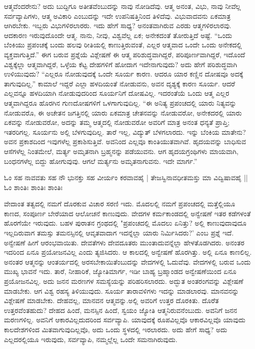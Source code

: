 ಆತ್ಮವೆಂದರೇನು? ಅದು ಬುದ್ದಿಗೂ ಅತೀತವೆಂಬುದನ್ನು ನಾವು ನೋಡಿದೆವು. ಆತ್ಮ ಅನಂತ, ವಿಭು, ನಾವು ನೀವೆಲ್ಲ ಸರ್ವವ್ಯಾಪಿಗಳು, ಆತ್ಮ ಅವಿಕಾರಿ ಎಂಬುದನ್ನು ಇದೇ ಉಪನಿಷತ್ತಿನಿಂದ ತಿಳಿದೆವು. ವಿಭುವಾದವನು ಏಕಮಾತ್ರ ಆಗಿರಬೇಕು. ಇಬ್ಬರು ವಿಭುಗಳಿರಲಾರರು. ಇದು ಹೇಗೆ ಸಾಧ್ಯ? ಅನಂತವಾಗಿರುವ ಎರಡು ಆತ್ಮಗಳಿರಲಾರವು. ಆದಕಾರಣ ಇರುವುದೊಂದೇ ಆತ್ಮ. ನಾನು, ನೀವು, ವಿಶ್ವವೆಲ್ಲ ಏಕ; ಅನೇಕದಂತೆ ತೋರುತ್ತಿದೆ ಅಷ್ಟೆ. “ಒಂದು ಬೆಂಕಿಯು ಪ್ರಪಂಚಕ್ಕೆ ಬಂದು ಹಲವು ರೀತಿಯಲ್ಲಿ ಕಾಣುತ್ತಿರುವಂತೆ, ಎಲ್ಲರ ಆತ್ಮವಾದ ಒಂದೇ ಒಂದು ಅನೇಕದಲ್ಲಿ ವ್ಯಕ್ತವಾಗುತ್ತಿದೆ.” ಈಗ ಬರುವ ಪ್ರಶ್ನೆಯೆ ವಿಶ್ಲೇಷಣೆ ಈ ಆತ್ಮ ಪರಿಶುದ್ಧವಾಗಿದ್ದರೆ, ಪರಿಪೂರ್ಣವಾಗಿದ್ದರೆ, ಇದೊಂದೆ ವಿಶ್ವಕ್ಕೆಲ್ಲಾ ಆತ್ಮವಾಗಿದ್ದರೆ, ಒಳ್ಳೆಯ ಕೆಟ್ಟ ದೇಹಗಳಿಗೆ ಹೋದಾಗ ಇದೇನಾಗುವುದು? ಅದು ಹೇಗೆ ಪರಿಶುದ್ಧವಾಗಿ ಉಳಿಯುವುದು? “ಎಲ್ಲರೂ ನೋಡುವುದಕ್ಕೆ ಒಂದೇ ಸೂರ್ಯ ಕಾರಣ. ಆದರೂ ಯಾರ ಕಣ್ಣಿನ ದೋಷವೂ ಅದಕ್ಕೆ ತಾಗುವುದಿಲ್ಲ.” ಕಾಮಾಲೆ ಇದ್ದರೆ ಎಲ್ಲಾ ಹಳದಿಯಂತೆ ನೋಡುವನು, ಅವನ ದೃಶ್ಯಕ್ಕೆ ಕಾರಣ ಸೂರ್ಯ. ಆದರೆ ಎಲ್ಲವನ್ನೂ ಹಳದಿಯಾಗಿ ನೋಡುವುದರಿಂದ ಸೂರ್ಯನಿಗೆ ದೋಷವಿಲ್ಲ. ಇದರಂತೆಯೆ ಒಂದು ಆತ್ಮ ಎಲ್ಲರ ಆತ್ಮವಾಗಿದ್ದರೂ ಹೊರಗಿನ ಗುಣದೋಷಗಳಿಗೆ ಒಳಗಾಗುವುದಿಲ್ಲ. “ಈ ಅನಿತ್ಯ ಪ್ರಪಂಚದಲ್ಲಿ ಯಾರು ನಿತ್ಯವನ್ನು ನೋಡುವರೊ, ಈ ಅಚೇತನ ಜಗತ್ತಿನಲ್ಲಿ ಯಾರು ಏಕಮಾತ್ರ ಚೇತನವನ್ನು ನೋಡುವರೋ, ಅನೇಕದರಲ್ಲಿ ಯಾರು ಏಕವನ್ನು ನೋಡುವರೋ, ಅದನ್ನು ತಮ್ಮ ಆತ್ಮದಲ್ಲಿ ನೋಡುವರೋ ಅವರಿಗೆ ಮಾತ್ರ ಅನಂತ ಧನ್ಯತೆ ಪ್ರಾಪ್ತಿ; ಇತರರಿಗಲ್ಲ. ಸೂರ್ಯನು ಅಲ್ಲಿ ಬೆಳಗುವುದಿಲ್ಲ. ತಾರೆ ಇಲ್ಲ, ವಿದ್ಯುತ್ ಬೆಳಗಲಾರದು. ಇನ್ನು ಬೆಂಕಿಯ ಮಾತೇನು? ಅವನ ಪ್ರಕಾಶದಿಂದ ಇವುಗಳೆಲ್ಲ ಪ್ರಕಾಶಿಸುತ್ತಿವೆ. ಅವನಿಂದ ಎಲ್ಲವೂ ಕಾಂತಿಯುತವಾಗಿವೆ. ಹೃದಯವನ್ನು ಬಾಧಿಸುವ ಆಸೆಗಳೆಲ್ಲ ನಿಂತಮೇಲೆ, ಮರ್ತ್ಯ ಅಮೃತನಾಗಿ ಬ್ರಹ್ಮನನ್ನು ಪಡೆಯುವನು. ಆಗ ಹೃದಯಗ್ರಂಥಿಗಳು ಮಾಯವಾಗಿ, ಬಂಧನಗಳೆಲ್ಲ ಬಿದ್ದು ಹೋಗುವುವು. ಆಗಲೆ ಮರ್ತ್ಯನು ಅಮೃತನಾಗುವನು. ಇದೇ ಮಾರ್ಗ.”

ಓಂ ಸಹ ನಾವವತು ಸಹ ನೌ ಭುನಕ್ತು ಸಹ ವೀರ್ಯಂ ಕರವಾವಹೈ | ತೇಜಸ್ವಿನಾವಧೀತಮಸ್ತು ಮಾ ವಿದ್ವಿಷಾವಹೈ || ಓಂ ಶಾಂತಿಃ ಶಾಂತಿಃ ಶಾಂತಿಃ

ವೇದಾಂತ ತತ್ವದಲ್ಲಿ ನಮಗೆ ದೊರಕುವ ವಿಚಾರ ಸರಣಿ ಇದು. ಮೊದಲಲ್ಲಿ ನಮಗೆ ಪ್ರಪಂಚದಲ್ಲಿ ಮತ್ತೆಲ್ಲಿಯೂ ಕಾಣದ, ಸಂಪೂರ್ಣ ಬೇರೆಯಾದ ಆಲೋಚನೆ ಕಾಣುವುದು. ವೇದಗಳ ಕರ್ಮಕಾಂಡದಲ್ಲಿ ಅನ್ವೇಷಣೆ ಇತರ ಕಡೆಗಳಂತೆ ಹೊರಗೆಯೇ ಇರುವುದು. ಬಹಳ ಪುರಾತನ ಗ್ರಂಥದಲ್ಲಿ "ಪ್ರಪಂಚದಲ್ಲಿ ಮೊದಲು ಏನಿತ್ತು? ಅಲ್ಲಿ ಕಾಣುವುದಾವುದೂ ಇಲ್ಲದಿರುವಾಗ ತಮಸ್ಸು ತಮನಸ್ಸಿನಲ್ಲಿ ಆವೃತವಾದಾಗ ಇದನ್ನೆಲ್ಲಾ ಯಾರು ನಿರ್ಮಿಸಿದರು?' ಎಂಬ ಪ್ರಶ್ನೆ ಇದೆ. ಅನ್ವೇಷಣೆ ಹೀಗೆ ಆರಂಭವಾಯಿತು. ದೇವತೆಗಳು ದೇವದೂತರು ಮುಂತಾದುವನ್ನೆಲ್ಲಾ ಹೇಳತೊಡಗಿದರು. ಅನಂತರ ಇದರಿಂದ ಏನೂ ಪ್ರಯೋಜನವಿಲ್ಲ ಎಂದು ತ್ಯಜಿಸಿದರು. ಆ ಕಾಲದಲ್ಲಿ ಅನ್ವೇಷಣೆ ಹೊರಗಿತ್ತು. ಅಲ್ಲಿ ಏನೂ ಕಾಣಲಿಲ್ಲ. ಅನಂತರ ಆತ್ಮನನ್ನು ಆಂತರ್ಯದಲ್ಲಿ ಅರಸಬೇಕಾಯಿತೆಂಬುದನ್ನು ವೇದಗಳಲ್ಲಿ ಓದುವೆವು. ವೇದಗಳಲ್ಲಿ ಬರುವ ಒಂದು ಮುಖ್ಯ ಭಾವನೆ ಇದು. ತಾರೆ, ನೀಹಾರಿಕೆ, ಜ್ಯೋತಿಮಾರ್ಗ, ಇಡೀ ಬಾಹ್ಯ ಬ್ರಹ್ಮಾಂಡದ ಅನ್ವೇಷಣೆಯಿಂದ ಏನೂ ಪ್ರಯೋಜನವಿಲ್ಲ. ಅದು ಜನನ ಮರಣಗಳ ಸಮಸ್ಯೆಯನ್ನು ಪರಿಹರಿಸಲಾರದು. ಅದ್ಭುತ ಅಂತರಂಗವನ್ನು ವಿಶ್ಲೇಷಣೆ ಮಾಡಬೇಕು. ಆಗ ವಿಶ್ವ ರಹಸ್ಯ ತಿಳಿಯುವುದು. ಸೂರ್ಯ ತಾರಾವಳಿಗಳು ಇದನ್ನು ಮಾಡಲಾರವು. ಮಾನವನನ್ನು ವಿಶ್ಲೇಷಣೆ ಮಾಡಬೇಕು. ದೇಹವಲ್ಲ, ಮಾನವನ ಆತ್ಮವನ್ನು.ಅಲ್ಲಿ ಅವರಿಗೆ ಉತ್ತರ ದೊರಕಿತು. ದೊರೆತ ಉತ್ತರವೆಂತಹುದು? ದೇಹದ ಹಿಂದೆ, ಮನಸ್ಸಿನ ಹಿಂದೆ, ಸ್ವಯಂ ಜ್ಯೋತಿ ಆತ್ಮನಿರುವನೆಂಬುದು. ಅವನಿಗೆ ಜನನ ಮರಣಗಳಿಲ್ಲ. ಅವನಿಗೆ ಆಕಾರವಿಲ್ಲದುದರಿಂದ ಸರ್ವವ್ಯಾಪಿ. ಯಾವುದಕ್ಕೆ ರೂಪವಿಲ್ಲವೊ ಆಕಾರವಿಲ್ಲವೊ ಯಾವುದು ಕಾಲದೇಶಗಳಿಂದ ಮಿತವಾಗುವುದಿಲ್ಲವೊ, ಅದು ಒಂದು ಸ್ಥಳದಲ್ಲಿ ಇರಲಾರದು. ಅದು ಹೇಗೆ ಸಾಧ್ಯ? ಅದು ಎಲ್ಲದರಲ್ಲಿಯೂ ಇರುವುದು, ಸರ್ವವ್ಯಾಪಿ, ನಮ್ಮಲ್ಲೆಲ್ಲ ಒಂದೇ ಸಮನಾಗಿರುವುದು.

